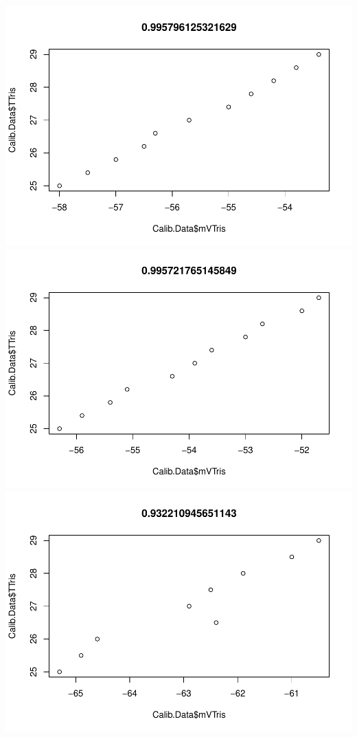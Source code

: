 \documentclass[
]{article}
\begin{document}
\includegraphics{daily-measurements_files/figure-latex/unnamed-chunk-5-7.pdf}
\includegraphics{daily-measurements_files/figure-latex/unnamed-chunk-5-8.pdf}
\includegraphics{daily-measurements_files/figure-latex/unnamed-chunk-5-9.pdf}
\end{document}
